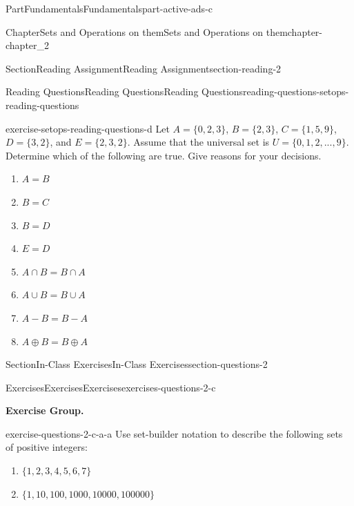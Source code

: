 \documentclass[oneside,10pt,]{book}
\numberwithin{equation}{section}
\begin{document}
\begin{partptx}{Part}{Fundamentals}{}{Fundamentals}{}{}{part-active-ads-c}
\begin{chapterptx}{Chapter}{Sets and Operations on them}{}{Sets and Operations on them}{}{}{chapter-chapter_2}
\begin{sectionptx}{Section}{Reading Assignment}{}{Reading Assignment}{}{}{section-reading-2}
\begin{reading-questions-subsection-numberless}{Reading Questions}{Reading Questions}{}{Reading Questions}{}{}{reading-questions-setops-reading-questions}
\begin{divisionexercise}{3}{}{}{exercise-setops-reading-questions-d}
Let \(A = \{0, 2, 3\}\), \(B = \{2, 3\}\), \(C = \{1, 5, 9\}\), \(D = \{3, 2\}\), and \(E = \{2, 3, 2\}\). Assume that the universal set is \(U = \{0, 1, 2, . . . , 9\}\). Determine which of the following are true. Give reasons for your decisions.%
\begin{multicols}{2}
\begin{enumerate}[label=(\alph*)]
\item{}\(\displaystyle A = B\)%
\item{}\(\displaystyle B = C\)%
\item{}\(\displaystyle B = D\)%
\item{}\(\displaystyle E=D\)%
\item{}\(\displaystyle A\cap B = B\cap A\)%
\item{}\(\displaystyle A \cup  B = B \cup  A\)%
\item{}\(\displaystyle A-B = B-A\)%
\item{}\(\displaystyle A \oplus  B = B \oplus  A\)%
\end{enumerate}
\end{multicols}
%
\end{divisionexercise}%
\end{reading-questions-subsection-numberless}
\end{sectionptx}
%
%
\typeout{************************************************}
\typeout{************************************************}
%
\begin{sectionptx}{Section}{In-Class Exercises}{}{In-Class Exercises}{}{}{section-questions-2}
%
%
%
\typeout{************************************************}
\typeout{************************************************}
%
\begin{exercises-subsection-numberless}{Exercises}{Exercises}{}{Exercises}{}{}{exercises-questions-2-c}
\par\medskip\noindent%
\textbf{Exercise Group.}\space\space%
\begin{exercisegroup}
\begin{divisionexerciseeg}{1}{}{}{exercise-questions-2-c-a-a}%
Use set-builder notation to describe the following sets of positive integers:%
\begin{enumerate}[label=(\alph*)]
\item{}\(\displaystyle \{1, 2, 3, 4, 5, 6, 7\}\)%
\item{}\(\displaystyle \{1, 10, 100, 1000, 10000, 100000\}\)%
\end{enumerate}

\end{divisionexerciseeg}
\end{exercisegroup}
\end{exercises-subsection-numberless}
\end{sectionptx}
\end{chapterptx}
\end{partptx}
\end{document}
